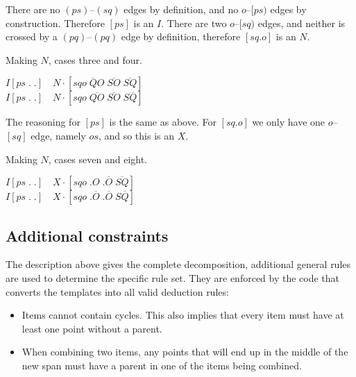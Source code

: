 There are no $(ps)$--$(sq)$ edges by definition, and no $o$--$[ps)$ edges by construction.
Therefore $[ps]$ is an $I$.
There are two $o$--$[sq)$ edges, and neither is crossed by a $(pq)$--$(pq)$ edge by definition, therefore $[sq.o]$ is an $N$.

\begin{finalEquation}
\caption{Making $N$, cases three and four.}
  $I[ps \; . \; .] \quad N\cdotp [sqo \; \overline{Q}O \; \overline{SO} \; \overline{SQ}]$ \\
  $I[ps \; . \; .] \quad N\cdotp [sqo \; \overline{QO} \; \overline{SO} \; S\overline{Q}]$
\end{finalEquation}

\begin{center}
\end{center}

The reasoning for $[ps]$ is the same as above.
For $[sq.o]$ we only have one $o$--$[sq]$ edge, namely $os$, and so this is an $X$.

\begin{finalEquation}
\caption{Making $N$, cases seven and eight.}
  $I[ps \; . \; .] \quad X\cdotp [sqo \; .O \; .\overline{O} \; \overline{SQ}]$ \\
  $I[ps \; . \; .] \quad X\cdotp [sqo \; .\overline{O} \; .\overline{O} \; S\overline{Q}]$
\end{finalEquation}

\subsection{Additional constraints}
The description above gives the complete decomposition, additional general rules are used to determine the specific rule set.
They are enforced by the code that converts the templates into all valid deduction rules:

\begin{itemize}
  \item Items cannot contain cycles.
  This also implies that every item must have at least one point without a parent.
  \item When combining two items, any points that will end up in the middle of the new span must have a parent in one of the items being combined.
\end{itemize}

